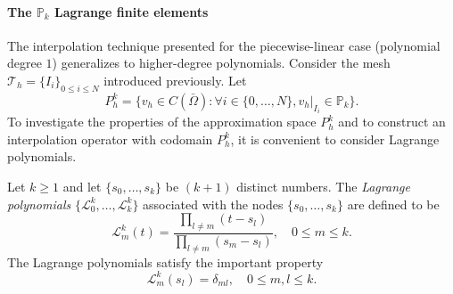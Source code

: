 \paragraph{\texorpdfstring{The $\mathbb{P}_k$ Lagrange finite elements}{The Pk Lagrange finite elements}}
The interpolation technique presented for the piecewise-linear case (polynomial degree $1$) generalizes to higher-degree polynomials. Consider the mesh $\mathcal{T}_h = \{I_i\}_{0 \le i \le N}$ introduced previously. Let
\begin{equation}\label{eq:def-Phk}
    P_h^k = \{ v_h \in C(\bar{\Omega}): \forall i \in \{0, \dots, N\}, v_h|_{I_i} \in \mathbb{P}_k \}.
\end{equation}
To investigate the properties of the approximation space $P_h^k$ and to construct an interpolation operator with codomain $P_h^k$, it is convenient to consider Lagrange polynomials.
\begin{definition}\label{def:lagrange-polynomials}
    Let $k \ge 1$ and let $\{s_0, \dots, s_k\}$ be $(k+1)$ distinct numbers. The \emph{Lagrange polynomials} $\{\mathcal{L}_0^k, \dots, \mathcal{L}_k^k\}$ associated with the nodes $\{s_0, \dots, s_k\}$ are defined to be
    \begin{equation}
        \mathcal{L}_m^k(t) = \frac{\prod_{l \ne m}(t - s_l)}{\prod_{l \ne m}(s_m - s_l)}, \quad 0 \le m \le k.
    \end{equation}
    The Lagrange polynomials satisfy the important property
    \begin{equation}
        \mathcal{L}_m^k(s_l) = \delta_{ml}, \quad 0 \le m,l \le k.
    \end{equation}
\end{definition}

